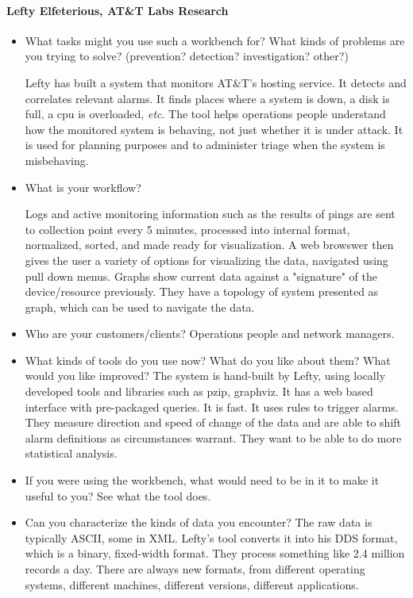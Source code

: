 \documentclass{article}
\begin{document}
\paragraph*{Lefty Elfeterious, AT\&T Labs Research}
\begin{itemize}
\item What tasks might you use such a workbench for?  What kinds of problems are you trying to solve? (prevention? detection? investigation? other?)

Lefty has built a system that monitors AT\&T's hosting service. It
detects and correlates relevant alarms.  It finds places where a
system is down, a disk is full, a cpu is overloaded, \textit{etc}.
The tool helps operations people understand how the monitored system
is behaving, not just whether it is under attack.  It is used for
planning purposes and to administer triage when the system is misbehaving.

\item What is your workflow?

Logs and active monitoring information such as the results of pings
are sent to collection point every 5 minutes, processed into internal
format, normalized, sorted, and made ready for visualization.  A web
browswer then gives the user a variety of options for visualizing the
data, navigated using pull down menus.  Graphs show current data
against a "signature" of the device/resource previously. They have a
topology of system presented as graph, which can be used to navigate
the data.

\item Who are your customers/clients?  
Operations people and network managers.


\item What kinds of tools do you use now?  What do you like about
  them?  What would you like improved? 
The system is hand-built by Lefty, using locally developed tools and
libraries such as pzip, graphviz.  It has a web based interface with
pre-packaged queries.  It is fast. It uses rules to trigger alarms. 
They measure direction and speed of change of the data and are able to
shift alarm definitions as circumstances warrant. They want to be able
to do more statistical analysis. 

\item If you were using the workbench, what would need to be in it to
 make it useful to you?  See what the tool does.

\item Can you characterize the kinds of data you encounter?
The raw data is typically ASCII, some in XML.  Lefty's tool converts
it into his DDS format, which is a binary, fixed-width format.  They
process something like 2.4 million records a day.  There are always
new formats, from different operating systems, different machines,
different versions, different applications.


\end{itemize}
\end{document}
